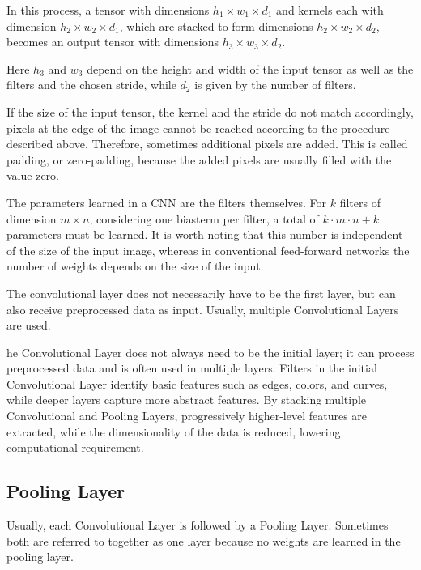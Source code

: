 In this process, a tensor with dimensions $h_1 \times w_1 \times d_1$ and kernels each with dimension $h_2 \times w_2 \times d_1$, which are stacked to form dimensions $h_2 \times w_2 \times d_2$, becomes an output tensor with dimensions $h_3 \times w_3 \times d_2$. \cite{Arunava:2018}

Here $h_3$ and $w_3$ depend on the height and width of the input tensor as well as the filters and the chosen stride, while $d_2$ is given by the number of filters.

If the size of the input tensor, the kernel and the stride do not match accordingly, pixels at the edge of the image cannot be reached according to the procedure described above. Therefore, sometimes additional pixels are added. This is called padding, or zero-padding, because the added pixels are usually filled with the value zero. \cite{Michelucci:2019}

The parameters learned in a CNN are the filters themselves. For $k$ filters of dimension $m \times n$, considering one biasterm per filter, a total of $k \cdot m \cdot n + k$ parameters must be learned. It is worth noting that this number is independent of the size of the input image, whereas in conventional feed-forward networks the number of weights depends on the size of the input.\cite{Michelucci:2019}

The convolutional layer does not necessarily have to be the first layer, but can also receive preprocessed data as input. Usually, multiple Convolutional Layers are used.\cite{Michelucci:2019}

he Convolutional Layer does not always need to be the initial layer; it can process preprocessed data and is often used in multiple layers. Filters in the initial Convolutional Layer identify basic features such as edges, colors, and curves, while deeper layers capture more abstract features. By stacking multiple Convolutional and Pooling Layers, progressively higher-level features are extracted, while the dimensionality of the data is reduced, lowering computational requirement. \cite{Gu:2018,Saha:2018}


\subsection{Pooling Layer}

Usually, each Convolutional Layer is followed by a Pooling Layer. Sometimes both are referred to together as one layer because no weights are learned in the pooling layer. \cite{Michelucci:2019}


